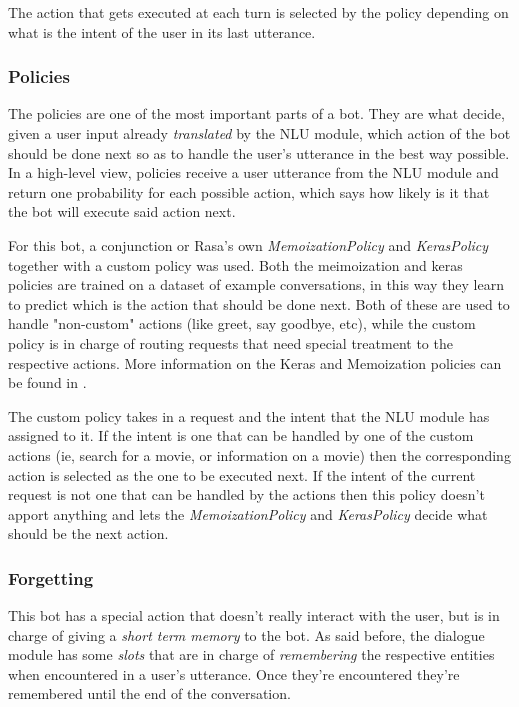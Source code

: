 \documentclass[11pt,a4paper]{article}
\begin{document}
			The action that gets executed at each turn is selected by the policy depending on what is the intent of the user in its last utterance. 

		\subsubsection{Policies}
		\label{ssec-policies}	
			
			The policies are one of the most important parts of a bot. They are what decide, given a user input already \textit{translated} by the NLU module, which action of the bot should be done next so as to handle the user's utterance in the best way possible. In a high-level view, policies receive a user utterance from the NLU module and return one probability for each possible action, which says how likely is it that the bot will execute said action next.
			
			For this bot, a conjunction or Rasa's own \textit{MemoizationPolicy} and \textit{KerasPolicy} together with a custom policy was used. Both the meimoization and keras policies are trained on a dataset of example conversations, in this way they learn to predict which is the action that should be done next. Both of these are used to handle "non-custom" actions (like greet, say goodbye, etc), while the custom policy is in charge of routing requests that need special treatment to the respective actions. More information on the Keras and Memoization policies can be found in \cite{rasacore}.
			
			The custom policy takes in a request and the intent that the NLU module has assigned to it. If the intent is one that can be handled by one of the custom actions (ie, search for a movie, or information on a movie) then the corresponding action is selected as the one to be executed next. If the intent of the current request is not one that can be handled by the actions then this policy doesn't apport anything and lets the \textit{MemoizationPolicy} and \textit{KerasPolicy} decide what should be the next action.
		
		
		\subsubsection{Forgetting}
		\label{ssec-forgetting}	
		
			This bot has a special action that doesn't really interact with the user, but is in charge of giving a \textit{short term memory} to the bot. As said before, the dialogue module has some \textit{slots} that are in charge of \textit{remembering} the respective entities when encountered in a user's utterance. Once they're encountered they're remembered until the end of the conversation. 
			
\end{document}
